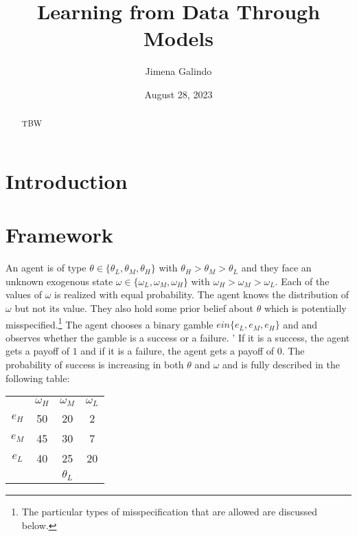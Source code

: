 \documentclass[
  12pt,
]{article}
\title{Learning from Data Through Models}
\author{Jimena Galindo}
\date{August 28, 2023}
\begin{document}
\maketitle
\begin{abstract}
TBW
\end{abstract}

\hypertarget{introduction}{%
\section{Introduction}\label{introduction}}

\hypertarget{framework}{%
\section{Framework}\label{framework}}

An agent is of type \(\theta \in \{\theta_L, \theta_M, \theta_H\}\) with
\(\theta_H > \theta_M > \theta_L\) and they face an unknown exogenous
state \(\omega \in \{\omega_L, \omega_M, \omega_H\}\) with
\(\omega_H>\omega_M>\omega_L\). Each of the values of \(\omega\) is
realized with equal probability. The agent knows the distribution of
\(\omega\) but not its value. They also hold some prior belief about
\(\theta\) which is potentially
misspecified.\footnote{The particular types of misspecification
that are allowed are discussed below.} The agent chooses a binary gamble
\(e in \{e_L, e_M, e_H\}\) and and observes whether the gamble is a
success or a failure. ' If it is a success, the agent gets a payoff of
\(1\) and if it is a failure, the agent gets a payoff of \(0\). The
probability of success is increasing in both \(\theta\) and \(\omega\)
and is fully described in the following table:

\begin{tabular}{ c|c|c|c|}
  
  \multicolumn{1}{c}{} & \multicolumn{1}{c}{$\omega_H$} & \multicolumn{1}{c}{$\omega_M$} & \multicolumn{1}{c}{$\omega_L$}\\
  \cline{2-4}
  $e_H$ & 50 & 20 & 2 \\
  \cline{2-4}
  $e_M$ & 45 & 30 & 7 \\
  \cline{2-4}
  $e_L$ & 40 & 25 & 20 \\
  \cline{2-4}
  \multicolumn{1}{c}{} & \multicolumn{1}{c}{} & \multicolumn{1}{c}{$\theta_L$} & \multicolumn{1}{c}{}\\
\end{tabular}
\hspace{.3cm}
\end{document}
